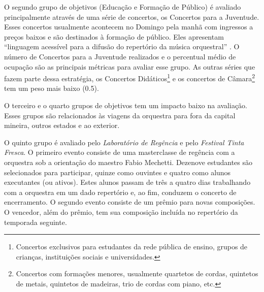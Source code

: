 \documentclass[a4paper, 12pt, openright, oneside, german, french, english, brazil]{abntex2}
\begin{document}
	O segundo grupo de objetivos (Educação e Formação de Público) é avaliado principalmente através de uma série de concertos, os Concertos para a Juventude. Esses concertos usualmente acontecem no Domingo pela manhã com ingressos a preços baixos e são destinados à formação de público. Eles apresentam ``linguagem acessível para a difusão do repertório da música orquestral'' \cite[p. 9]{filarmonica2017gerencial}. O número de Concertos para a Juventude realizados e o percentual médio de ocupação são as principais métricas para avaliar esse grupo. As outras séries que fazem parte dessa estratégia, os Concertos Didáticos\footnote{Concertos exclusivos para estudantes da rede pública de ensino, grupos de crianças, instituições sociais e universidades.} e os concertos de Câmara\footnote{Concertos com formações menores, usualmente quartetos de cordas, quintetos de metais, quintetos de madeiras, trio de cordas com piano, etc.} tem um peso mais baixo (0.5).
	
	
	O terceiro e o quarto grupos de objetivos tem um impacto baixo na avaliação. Esses grupos são relacionados às viagens da orquestra para fora da capital mineira, outros estados e ao exterior.
	
	
	O quinto grupo é avaliado pelo \textit{Laboratório de Regência} e pelo \textit{Festival Tinta Fresca}. O primeiro evento consiste de uma masterclasse de regência com a orquestra sob a orientação do maestro Fabio Mechetti. Dezenove estudantes são selecionados para participar, quinze como ouvintes e quatro como alunos executantes (ou ativos). Estes alunos passam de três a quatro dias trabalhando com a orquestra em um dado repertório e, ao fim, conduzem o concerto de encerramento. O segundo evento consiste de um prêmio para novas composições. O vencedor, além do prêmio, tem sua composição incluída no repertório da temporada seguinte.
	
\end{document}
